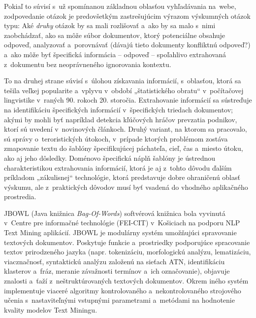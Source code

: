 \begin{multicols}{2}
Pokiaľ to súvisí
s~už spomínanou základnou oblasťou vyhľadávania na~webe,
zodpovedanie otázok je predovšetkým zastrešujúcim výrazom
výskumných otázok typu: Aké \emph{druhy} otázok by sa mali
rozlišovať a~ako by sa malo s~nimi zaobchádzať, ako sa môže súbor
dokumentov, ktorý potenciálne obsahuje odpoveď, analyzovať
a~porovnávať (dávajú tieto dokumenty konfliktnú odpoveď?) a~ako
môže byť špecifická informácia – odpoveď – spoľahlivo
extrahovaná z~dokumentu bez neoprávneného ignorovania kontextu. 


To na druhej strane súvisí s~úlohou získavania informácií, s~oblasťou, ktorá sa tešila veľkej popularite a~vplyvu v~období „štatistického obratu“ v~počítačovej lingvistike v~raných 90. rokoch 20. storočia. Extrahovanie informácií sa sústreďuje na identifikáciu špecifických informácií v~špecifických triedach dokumentov; akými by mohli byť napríklad detekcia kľúčových hráčov prevzatia podnikov, ktorí sú uvedení v~novinových článkoch. Druhý variant, na ktorom sa pracovalo, sú správy o~teroristických útokoch, v~prípade ktorých problémom zostáva zmapovanie textu do šablóny špecifikujúcej páchateľa, cieľ, čas a~miesto útoku, ako aj jeho dôsledky. Doménovo špecifická náplň šablóny je ústrednou charakteristikou extrahovania informácií, ktorá je aj z~tohto dôvodu ďalším príkladom „zákulisnej“ technológie, ktorá predstavuje dobre ohraničenú oblasť výskumu, ale z~praktických dôvodov musí byť vsadená do vhodného aplikačného prostredia. 

JBOWL (Java knižnica \emph{Bag-Of-Words}) softvérová knižnica bola vyvinutá v~Centre pre informačné technológie (FEI-CIT) v~Košiciach na podporu NLP Text Mining aplikácií. JBOWL je modulárny systém umožňujúci spravovanie textových dokumentov. Poskytuje funkcie a~prostriedky podporujúce spracovanie textov prirodzeného jazyka (napr. tokenizáciu, morfologickú analýzu, lematizáciu, viacznačnosť, syntaktickú analýzu založenú na sieťach ATN, identifikáciu klasterov a~fráz, meranie závažnosti termínov a~ich označovanie), objavuje znalosti a~ťaží z~neštruktúrovaných textových dokumentov. Okrem iného systém implementuje viaceré algoritmy kontrolovaného a~nekontrolovaného strojového učenia s~nastaviteľnými vstupnými parametrami a~metódami na hodnotenie kvality modelov Text Miningu.


\end{multicols}
